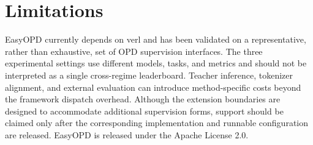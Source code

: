 \section*{Limitations}

EasyOPD currently depends on verl and has been validated on a representative, rather than exhaustive, set of OPD supervision interfaces. The three experimental settings use different models, tasks, and metrics and should not be interpreted as a single cross-regime leaderboard. Teacher inference, tokenizer alignment, and external evaluation can introduce method-specific costs beyond the framework dispatch overhead. Although the extension boundaries are designed to accommodate additional supervision forms, support should be claimed only after the corresponding implementation and runnable configuration are released. EasyOPD is released under the Apache License 2.0.
